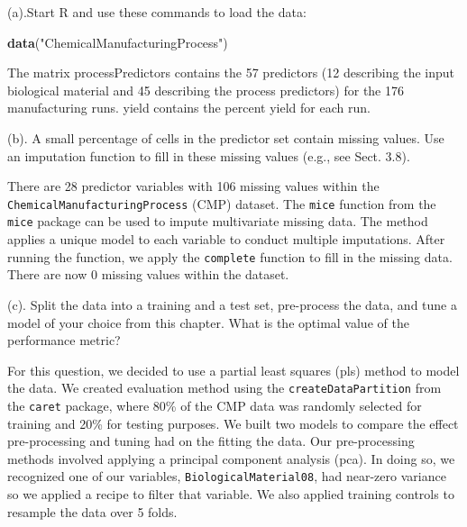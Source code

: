 \documentclass[]{report}
\newenvironment{Shaded}{\begin{snugshade}}{\end{snugshade}}
\newcommand{\KeywordTok}[1]{\textcolor[rgb]{0.13,0.29,0.53}{\textbf{#1}}}
\newcommand{\NormalTok}[1]{#1}
\newcommand{\StringTok}[1]{\textcolor[rgb]{0.31,0.60,0.02}{#1}}
\begin{document}
\begin{subquestion}{(a).}Start R and use these commands to load the data:
\end{subquestion}

\begin{Shaded}
\begin{Highlighting}[]
\KeywordTok{data}\NormalTok{(}\StringTok{"ChemicalManufacturingProcess"}\NormalTok{)}
\end{Highlighting}
\end{Shaded}

The matrix processPredictors contains the 57 predictors (12 describing
the input biological material and 45 describing the process predictors)
for the 176 manufacturing runs. yield contains the percent yield for
each run.

\begin{subquestion}{(b).} A small percentage of cells in the predictor set contain missing values. Use an imputation function to fill in these missing values (e.g., see Sect. 3.8). 
\end{subquestion}

There are 28 predictor variables with 106 missing values within the
\texttt{ChemicalManufacturingProcess} (CMP) dataset. The \texttt{mice}
function from the \texttt{mice} package can be used to impute
multivariate missing data. The method applies a unique model to each
variable to conduct multiple imputations. After running the function, we
apply the \texttt{complete} function to fill in the missing data. There
are now 0 missing values within the dataset.

\begin{subquestion}{(c).} Split the data into a training and a test set, pre-process the data, and tune a model of your choice from this chapter. What is the optimal value of the performance metric? 
\end{subquestion}

For this question, we decided to use a partial least squares (pls)
method to model the data. We created evaluation method using the
\texttt{createDataPartition} from the \texttt{caret} package, where 80\%
of the CMP data was randomly selected for training and 20\% for testing
purposes. We built two models to compare the effect pre-processing and
tuning had on the fitting the data. Our pre-processing methods involved
applying a principal component analysis (pca). In doing so, we
recognized one of our variables, \texttt{BiologicalMaterial08}, had
near-zero variance so we applied a recipe to filter that variable. We
also applied training controls to resample the data over 5 folds.
\end{document}
